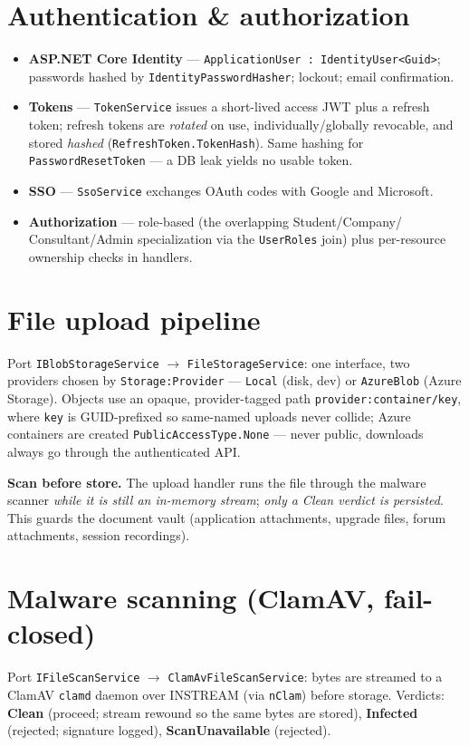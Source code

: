 \documentclass[11pt,a4paper]{article}
\newcommand{\code}[1]{\texttt{\textcolor{spInk}{#1}}}
\begin{document}
\section{Authentication \& authorization}
\begin{itemize}
\item \textbf{ASP.NET Core Identity} --- \code{ApplicationUser : IdentityUser<Guid>};
  passwords hashed by \code{IdentityPasswordHasher}; lockout; email confirmation.
\item \textbf{Tokens} --- \code{TokenService} issues a short-lived access JWT plus a
  refresh token; refresh tokens are \emph{rotated} on use, individually/globally
  revocable, and stored \emph{hashed} (\code{RefreshToken.TokenHash}). Same hashing
  for \code{PasswordResetToken} --- a DB leak yields no usable token.
\item \textbf{SSO} --- \code{SsoService} exchanges OAuth codes with Google and
  Microsoft.
\item \textbf{Authorization} --- role-based (the overlapping Student/Company/
  Consultant/Admin specialization via the \code{UserRoles} join) plus per-resource
  ownership checks in handlers.
\end{itemize}

\section{File upload pipeline}
Port \code{IBlobStorageService} $\rightarrow$ \code{FileStorageService}: one
interface, two providers chosen by \code{Storage:Provider} --- \code{Local}
(disk, dev) or \code{AzureBlob} (Azure Storage). Objects use an opaque,
provider-tagged path \code{provider:container/key}, where \code{key} is
GUID-prefixed so same-named uploads never collide; Azure containers are created
\code{PublicAccessType.None} --- never public, downloads always go through the
authenticated API.

\begin{howbox}
\textbf{Scan before store.} The upload handler runs the file through the malware
scanner \emph{while it is still an in-memory stream}; \emph{only a Clean verdict is
persisted}. This guards the document vault (application attachments, upgrade
files, forum attachments, session recordings).
\end{howbox}

\section{Malware scanning (ClamAV, fail-closed)}
Port \code{IFileScanService} $\rightarrow$ \code{ClamAvFileScanService}: bytes are
streamed to a ClamAV \code{clamd} daemon over INSTREAM (via \code{nClam}) before
storage. Verdicts: \textbf{Clean} (proceed; stream rewound so the same bytes are
stored), \textbf{Infected} (rejected; signature logged), \textbf{ScanUnavailable}
(rejected).
\end{document}

